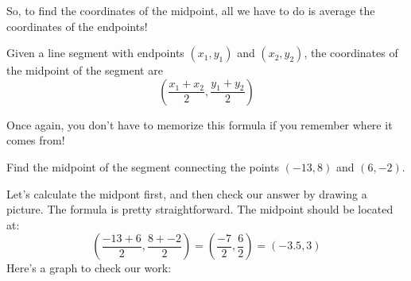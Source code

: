 So, to find the coordinates of the midpoint, all we have to do is average the coordinates of the endpoints!

\begin{boxeddef}
Given a line segment with endpoints $(x_1, y_1)$ and $(x_2, y_2)$, the coordinates of the midpoint of the segment are \[\left( \frac{x_1+x_2}{2}, \frac{y_1+y_2}{2} \right)\]
\end{boxeddef}

Once again, you don't have to memorize this formula if you remember where it comes from!

\begin{boxedex}
Find the midpoint of the segment connecting the points $(-13,8)$ and $(6, -2)$.

 Let's calculate the midpont first, and then check our answer by drawing a picture. The formula is pretty straightforward. The midpoint should be located at: \[\left( \frac{-13+6}{2}, \frac{8+-2}{2} \right) = \left( \frac{-7}{2}, \frac{6}{2} \right) = (-3.5, 3) \]
Here's a graph to check our work:
\begin{center}
\end{center}
\end{boxedex}

%
%

